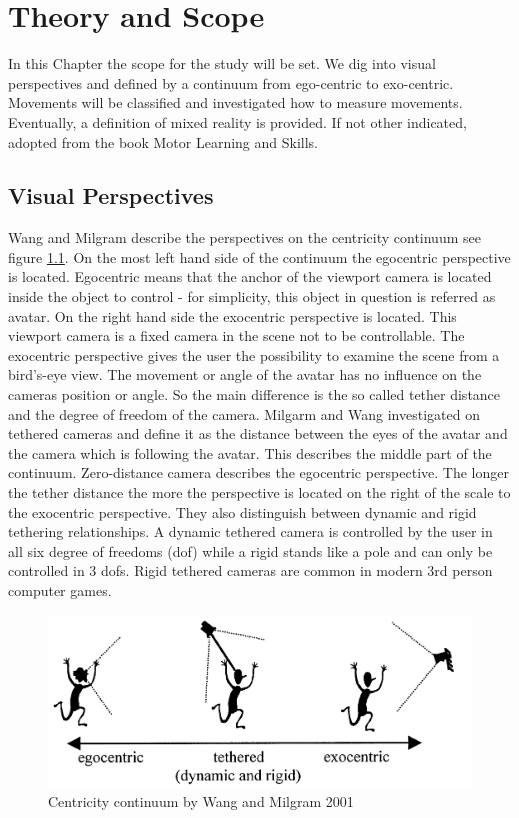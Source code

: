 \chapter{Theory and Scope}
In this Chapter the scope for the study will be set.  We dig into visual perspectives and defined by a continuum from ego-centric to exo-centric. Movements will be classified and investigated how to measure movements. Eventually, a definition of mixed reality is provided. If not other indicated, adopted from the book Motor Learning and Skills\cite{Schmidt2011}.

\section{Visual Perspectives}
Wang and Milgram \cite{Wang2001} describe the perspectives on the centricity continuum see figure \ref{fig:ego-exo-cont}. On the most left hand side of the continuum the egocentric perspective is located. Egocentric means that the anchor of the viewport camera is located inside the object to control - for simplicity, this object in question is referred as avatar. On the right hand side the exocentric perspective is located. This viewport camera is a fixed camera in the scene not to be controllable. The exocentric perspective gives the user the possibility to examine the scene from a bird's-eye view. The movement or angle of the avatar has no influence on the cameras position or angle. So the main difference is the so called tether distance and the degree of freedom of the camera. Milgarm and Wang investigated on tethered cameras and define it as the distance between the eyes of the avatar and the camera which is following the avatar. This describes the middle part of the continuum. Zero-distance camera describes the egocentric perspective. The longer the tether distance the more the perspective is located on the right of the scale to the exocentric perspective. They also distinguish between dynamic and rigid tethering relationships. A dynamic tethered camera is controlled by the user in all six degree of freedoms (dof) while a rigid stands like a pole and can only be controlled in 3 dofs. Rigid tethered cameras are common in modern 3rd person computer games.
\begin{figure}
	\centering
	\includegraphics[width=1.0\textwidth]{img/ego_exo_continuum_bigger.PNG}
	\caption{Centricity continuum by Wang and Milgram 2001 \cite{Wang2001}}
	\label{fig:ego-exo-cont}
\end{figure}

